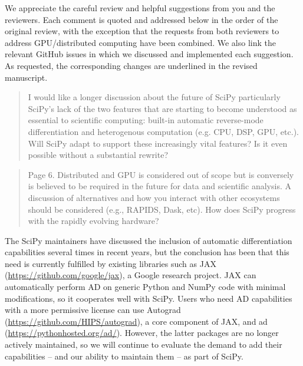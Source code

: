\documentclass[10pt,stdletter,dateno]{newlfm}
\begin{document}
\begin{newlfm}

We appreciate the careful review and helpful suggestions from you and the reviewers. Each comment is quoted and addressed below in the order of the original review, with the exception that the requests from both reviewers to address GPU/distributed computing have been combined. We also link the relevant GitHub issues in which we discussed and implemented each suggestion. As requested, the corresponding changes are underlined in the revised manuscript.

\begin{quote}
I would like a longer discussion about the future of SciPy particularly SciPy’s lack of the two features that are starting to become understood as essential to scientific computing: built-in automatic reverse-mode differentiation and heterogenous computation (e.g. CPU, DSP, GPU, etc.). Will SciPy adapt to support these increasingly vital features? Is it even possible without a substantial rewrite?
\end{quote}

\begin{quote}
Page 6. Distributed and GPU is considered out of scope but is conversely is believed to be required in the future for data and scientific analysis. A discussion of alternatives and how you interact with other ecosystems should be considered (e.g., RAPIDS, Dask, etc). How does SciPy progress with the rapidly evolving hardware?
\end{quote}

The SciPy maintainers have discussed the inclusion of automatic differentiation capabilities several times in recent years, but the conclusion has been that this need is currently fulfilled by existing libraries such as JAX (\url{https://github.com/google/jax}), a Google research project. JAX can automatically perform AD on generic Python and NumPy code with minimal modifications, so it cooperates well with SciPy. Users who need AD capabilities with a more permissive license can use Autograd (\url{https://github.com/HIPS/autograd}), a core component of JAX, and ad (\url{https://pythonhosted.org/ad/}). However, the latter packages are no longer actively maintained, so we will continue to evaluate the demand to add their capabilities -- and our ability to maintain them -- as part of SciPy.


\end{newlfm}
\end{document}

